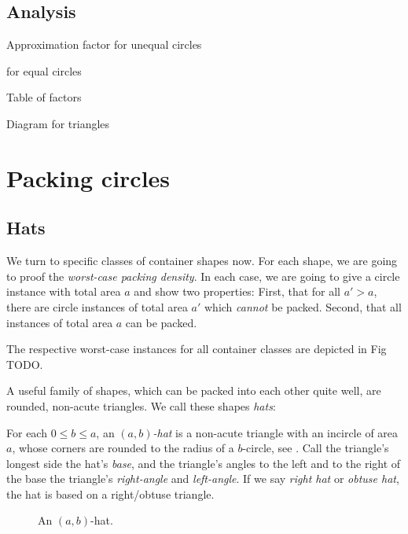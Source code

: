 \documentclass[a4paper,style=print,bibliography=totoc,nexus,lnum,extramargin]{tubsbook}
\begin{document}
\section{Analysis}

Approximation factor for unequal circles

for equal circles

Table of factors

Diagram for triangles

\chapter{Packing circles}

\section{Hats}

We turn to specific classes of container shapes now. For each shape, we are going to proof the \emph{worst-case packing density}. In each case, we are going to give a circle instance with total area $a$ and show two properties: First, that for all $a' > a$, there are circle instances of total area $a'$ which \emph{cannot} be packed. Second, that all instances of total area $a$ can be packed.

The respective worst-case instances for all container classes are depicted in Fig TODO.

A useful family of shapes, which can be packed into each other quite well, are rounded, non-acute triangles. We call these shapes \emph{hats}:

\begin{definition}
    For each $0 \le b \le a$, an \emph{$(a,b)$-hat} is a non-acute triangle with an incircle of area $a$, whose corners are rounded to the radius of a $b$-circle, see . Call the triangle's longest side the hat's \emph{base}, and the triangle's angles to the left and to the right of the base the triangle's \emph{right-angle} and \emph{left-angle}.
    If we say \emph{right hat} or \emph{obtuse hat}, the hat is based on a right/obtuse triangle.
\end{definition}

\newcommand\defaulta{30}
\newcommand\defaultb{40}
\newcommand\defaultr{0.2}
\newcommand\defaultx{0.6}

\begin{figure}

    \caption{An $(a,b)$-hat.}
    \label{fig:hat}
\end{figure}
\end{document}
